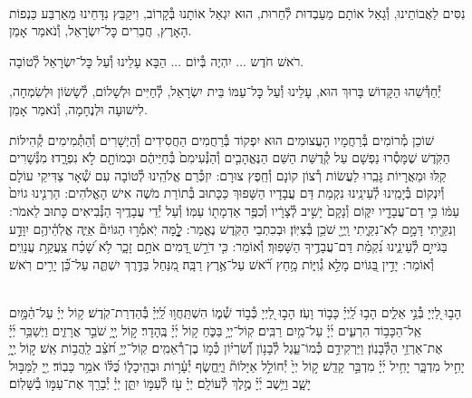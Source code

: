 \documentclass[twoside, openany, parskip=half, 11pt]{book}
\begin{document}
\\
נִסִּים לַאֲבוֹתֵינוּ, וְ֯גָאַל אוֹתָם מֵעַבְדוּת לְ֯חֵרוּת, הוּא יִגְאַל אוֹתָנוּ בְּ֯קָרוֹב, וִיקַבֵּץ נִדָּחֵינוּ מֵאַרְבַּע כַּנְפוֹת הָאָרֶץ, חֲבֵרִים כׇּל־יִשְׂרָאֵל, וְ֯נֹאמַר אָמֵן.

רֹאשׁ חֹדֶש ... יִהְיֶה בְּ֯יוֹם ... הַבָּא עָלֵינוּ וְ֯עַל כׇּל־יִשְׂרָאֵל לְ֯טוֹבָה.

יְ֯חַדְּ֯שֵׁהוּ הַקָּדוֹשׁ בָּרוּךְ הוּא, עָלֵינוּ וְ֯עַל כׇּל־עַמּוֹ בֵּית יִשְׂרָאֵל, לְ֯חַיִּים וּלְשָׁלוֹם, לְ֯שָׂשׂוֹן וּלְשִׂמְחָה, לִישׁוּעָה וּלְנֶחָמָה, וְ֯נֹאמַר אָמֵן.

\sepline

שׁוֹכֵן מְ֯רוֹמִים בְּ֯רַחֲמָיו הָעֲצוּמִים הוּא יִפְקוֹד בְּ֯רַחֲמִים הַחֲסִידִים וְ֯הַיְשָׁרִים וְ֯הַתְּ֯מִימִים קְ֯הִילּוֹת הַקֹּֽדֶשׁ שֶׁמָּסְ֯רוּ נַפְשָׁם עַל קְ֯דֻשַּׁת הַשֵּׁם הַנֶּאֱהָבִ֤ים וְ֯הַנְּ֯עִימִם֙ בְּ֯חַיֵּיהֶ֔ם וּבְמוֹתָ֖ם לֹ֣א נִפְרָ֑דוּ׃ מִנְּ֯שָׁרִים קַֽלּוּ וּמֵאֲרָיוֹת גָּבֵֽרוּ לַעֲשׂוֹת רְ֯צוֹן קוֹנָם וְ֯חֵֽפֶץ צוּרָם: יִזְכְּ֯רֵם אֱלֹהֵֽינוּ לְ֯טוֹבָה עִם שְׁ֯אָר צַדִּיקֵי עוֹלָם וְ֯יִנְקוֹם בְּ֯יָמֵֽינוּ לְ֯עֵינֵֽינוּ נִקְמַת דַּם עֲבָדָיו הַשָּׁפוּךְ כַּכָּתוּב בְּ֯תוֹרַת מֹשֶׁה אִישׁ הָאֱלֹהִים: הַרְנִ֤ינוּ גוֹיִם֙ עַמּ֔וֹ כִּ֥י דַם־עֲבָדָ֖יו יִקּ֑וֹם וְ֯נָקָם֙ יָשִׁ֣יב לְ֯צָרָ֔יו וְ֯כִפֶּ֥ר אַדְמָת֖וֹ עַמּֽוֹ׃ וְ֯עַל יְ֯דֵי עֲבָדֶֽיךָ הַנְּ֯בִיאִים כָּתוּב לֵאמֹר: וְנִקֵּ֖יתִי דָּמָ֣ם לֹֽא־נִקֵּ֑יתִי וַֽיְיָ֖ שֹׁכֵ֥ן בְּ֯צִיּֽוֹן׃ וּבְכִתְבֵי הַקֹּֽדֶשׁ נֶאֱמַר: לׇׇׇׇׇ֤מָּה יֹֽאמְ֯ר֣וּ הַגּוֹיִם֘ אַיֵּ֢ה אֱלֹֽהֵ֫יהֶ֥ם יִוָּדַ֣ע בַּגֹּייִ֣ם לְ֯עֵינֵ֑ינוּ נִ֝קְמַ֗ת דַּם־עֲבָדֶ֥יךָ הַשָּׁפֽוּךְ׃ וְ֯אוֹמֵר: כִּ֤י דֹרֵ֣שׁ דָּ֭מִים אֹתָ֣ם זָכָ֑ר לֹ֥א שָׁ֝כַ֗ח צַֽעֲקַ֥ת עֲנָוִֽים׃ וְ֯אוֹמֵר: יָדִ֣ין בַּ֭גּוֹיִם מָלֵ֣א גְ֯וִיּ֑וֹת מָ֥חַץ רֹ֝֗אשׁ עַל־אֶ֥רֶץ רַבָּֽה׃ מִ֭נַּחַל בַּדֶּ֣רֶךְ יִשְׁתֶּ֑ה עַל־כֵּ֝֗ן יָרִ֥ים רֹֽאשׁ׃



\vspace{-0.5\baselineskip}
\ashrei


\yehalelu

\\
%
הָב֣וּ לַ֭יְיָ בְּ֯נֵ֣י אֵלִ֑ים הָב֥וּ לַֽ֝יְיָ֗ כָּב֥וֹד וָעֹֽז׃
הָב֣וּ לַ֭יְיָ כְּ֯ב֣וֹד שְׁ֯מ֑וֹ הִשְׁתַּֽחֲו֥וּ לַֽ֝יְיָ֗ בְּ֯הַדְרַת־קֹֽדֶשׁ׃
ק֥וֹל יְיָ֗ עַל־הַ֫מָּ֥יִם אֵֽל־הַכָּב֥וֹד הִרְעִ֑ים יְ֜יָ֗ עַל־מַ֥יִם רַבִּֽים׃
קֽוֹל־יְיָ֥ בַּכֹּ֑חַ ק֥וֹל יְ֜יָ֗ בֶּֽהָדָר׃
ק֣וֹל יְ֖יָ֥ שֹׁבֵ֣ר אֲרָזִ֑ים וַיְשַׁבֵּ֥ר יְ֜יָ֗ אֶת־אַרְזֵ֥י הַלְּ֯בָנֽוֹן׃
וַיַּרְקִידֵ֥ם כְּ֯מוֹ־עֵ֑גֶל לְ֯בָנ֥וֹן וְ֝֯שִׂרְי֗וֹן כְּ֯מ֣וֹ בֶן־רְ֯אֵמִֽים׃
קֽוֹל־יְיָ֥ חֹ֝צֵ֗ב לַֽהֲב֥וֹת אֵֽשׁ׃
ק֣וֹל יְ֖יָ֥ יָחִ֣יל מִדְבָּ֑ר יָחִ֥יל יְ֜יָ֗ מִדְבַּ֣ר קָדֵֽשׁ׃
ק֣וֹל יְיָ֙ יְ֯חוֹלֵ֣ל אַיָּלוֹת֘ וַיֶּֽחֱשׂ֢ף יְ֯עָ֫ר֥וֹת וּבְהֵֽיכָל֑וֹ כֻּ֝לּ֗וֹ אֹמֵ֥ר כָּבֽוֹד׃
יְ֖יָ לַמַּבּ֣וּל יָשָׁ֑ב וַיֵּ֥שֶׁב יְ֜יָ֗ מֶ֣לֶךְ לְ֯עוֹלָֽם׃
יְיָ֗ עֹ֖ז לְ֯עַמּ֣וֹ יִתֵּ֑ן יְיָ֓ יְ֯בָרֵ֖ךְ אֶת־עַמּ֣וֹ בַ֯שָּׁלֽוֹם׃
\end{document}
